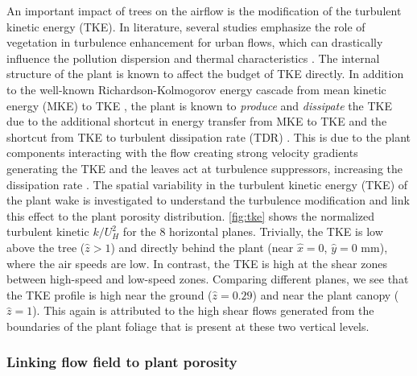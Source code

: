 An important impact of trees on the airflow is the modification of the turbulent kinetic energy (TKE). In literature, several studies emphasize the role of vegetation in turbulence enhancement for urban flows, which can drastically influence the pollution dispersion and thermal characteristics \citep{Amorim2013,Gromke2008,Poggi2004}. The internal structure of the plant is known to affect the budget of TKE directly. In addition to the well-known Richardson-Kolmogorov energy cascade from mean kinetic energy (MKE) to TKE \citep{Pope}, the plant is known to \textit{produce} and \textit{dissipate} the TKE due to the additional shortcut in energy transfer from MKE to TKE and the shortcut from TKE to turbulent dissipation rate (TDR) \citep{Finnigan2000,Wilson1977}. This is due to the plant components interacting with the flow creating strong velocity gradients generating the TKE and the leaves act at turbulence suppressors, increasing the dissipation rate \citep{Kenjeres2013}. The spatial variability in the turbulent kinetic energy (TKE) of the plant wake is investigated to understand the turbulence modification and link this effect to the plant porosity distribution. \cref{fig:tke} shows the normalized turbulent kinetic $k/U_H^2$ for the 8 horizontal planes. Trivially, the TKE is low above the tree ($\hat{z}>1$) and directly behind the plant (near  $\hat{x}= 0$, $\hat{y}= 0$ mm), where the air speeds are low. In contrast, the TKE is high at the shear zones between high-speed and low-speed zones. Comparing different planes, we see that the TKE profile is high near the ground ($\hat{z}=0.29$) and near the plant canopy ($\hat{z}=1$). This again is attributed to the high shear flows generated from the boundaries of the plant foliage that is present at these two vertical levels.

\subsubsection*{Linking flow field to plant porosity}
	
